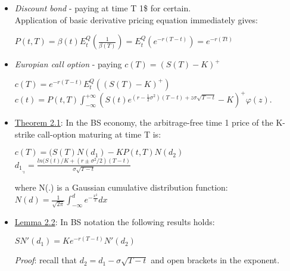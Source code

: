 \documentclass{article}
\begin{document}
\begin{itemize}
     \item \textit{Discount bond} - paying at time T 1\$ for certain. \\ Application of basic derivative pricing equation immediately gives:
     
\begin{center}   
$P(t, T)=\beta(t) E_t^Q\left(\frac{1}{\beta(T)}\right)=E_t^Q\left(e^{-r(T-t)}\right)=e^{-r(T t)}$

\end{center}


     \item \textit{Europian call option} - paying $c(T) = (S(T) - K)^+$
\begin{center}   
$c(T)=e^{-r(T-t)} E_t^Q\left((S(T)-K)^{+}\right)$
\\   [0.3cm]
$c(t)=P(t, T) \int_{-\infty}^{+\infty}\left(S(t) e^{\left(r-\frac{1}{2} \sigma^2\right)(T-t)+z\sigma\sqrt{T-t}}-K\right)^{+} \varphi(z).$
\end{center}

     \item \underline{Theorem 2.1}: In the BS economy, the arbitrage-free time 1 price of the K-strike call-option maturing at time T is:
\begin{center}   
$c(T) = (S(T)N(d_1) - KP(t,T)N(d_2)$
\\   [0.3cm]


$ d_1_,_2 = \frac{ln(S(t)/K +(r \pm \sigma^2/2) (T-t)}{\sigma\sqrt{T-t}}$

        where N(.) is a Gaussian cumulative distribution function:
        $N(d)=\frac{1}{\sqrt{2 \pi}} \int_{-\infty}^d e^{-\frac{x^2}{2}} d x$ 
\end{center}

     \item \underline{Lemma 2.2}: In BS notation the following results holds:

\begin{center}   
$SN'(d_1)=Ke^{-r(T-t)}N'(d_2)$
\end{center}

        \textit{Proof}: recall that $d_2 = d_1 - \sigma \sqrt{T-t}$  and open brackets in the exponent.

















\end{itemize}
\end{document}
